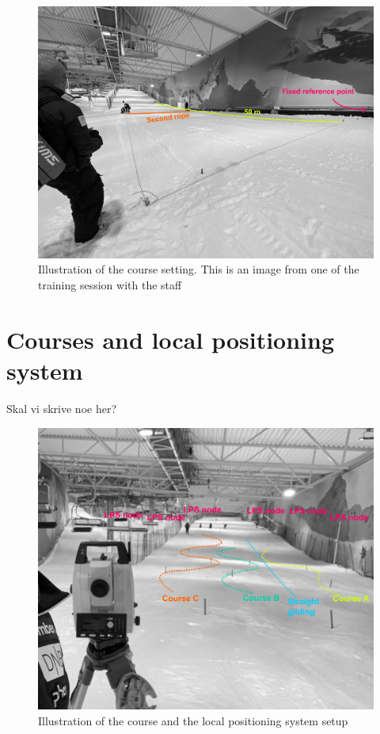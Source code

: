 \documentclass{article}
\begin{document}
\begin{figure}[H]
\centering
\includegraphics{figurer/figure_appendix_course.jpg}
\caption{Illustration of the course setting. This is an image from one of the training session with the staff}\label{fig: coursesetting}
\end{figure}



\section{Courses and local positioning system} \label{appendixb}
Skal vi skrive noe her?


\begin{figure}[H]
\centering
\includegraphics{figurer/figure_appendix_LPS.jpg}
\caption{Illustration of the course and the local positioning system setup}\label{fig: coursesetting}
\end{figure}
\end{document}
